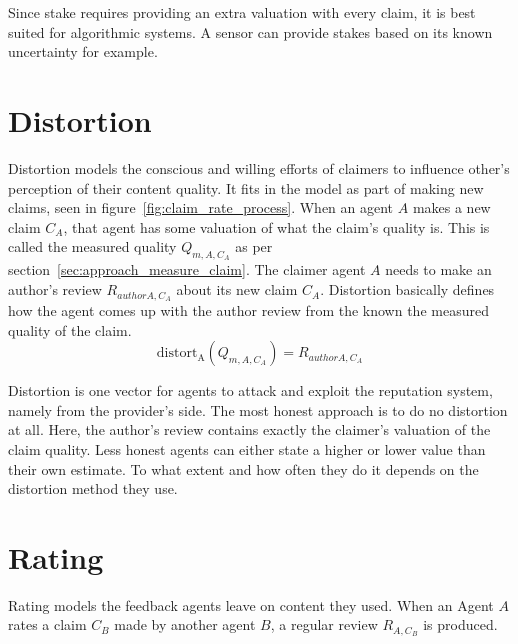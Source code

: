 \documentclass[%
    ]{\PathToTumTemplate/thesis/tum_thesis}
\begin{document}
Since stake requires providing an extra valuation with every claim, it is best suited for algorithmic systems.
A sensor can provide stakes based on its known uncertainty for example.



\section{Distortion}\label{sec:distort_strategies}

Distortion models the conscious and willing efforts of claimers to influence other's perception of their content quality.
It fits in the model as part of making new claims, seen in figure~\ref{fig:claim_rate_process}.
When an agent $A$ makes a new claim $C_A$, that agent has some valuation of what the claim's quality is.
This is called the measured quality $Q_{m,A,C_{A}}$ as per section~\ref{sec:approach_measure_claim}.
The claimer agent $A$ needs to make an author's review $R_{author A, C_{A}}$ about its new claim $C_A$.
Distortion basically defines how the agent comes up with the author review from the known the measured quality of the claim.
\begin{equation}
\mathrm{distort_{A}}(Q_{m,A,C_{A}}) = R_{author A, C_{A}}
\end{equation}

Distortion is one vector for agents to attack and exploit the reputation system, namely from the provider's side.
The most honest approach is to do no distortion at all.
Here, the author's review contains exactly the claimer's valuation of the claim quality.
Less honest agents can either state a higher or lower value than their own estimate.
To what extent and how often they do it depends on the distortion method they use.




\section{Rating}\label{sec:approach_rating_strategies}

Rating models the feedback agents leave on content they used.
When an Agent $A$ rates a claim $C_B$ made by another agent $B$, a regular review $R_{A,C_{B}}$ is produced.
\end{document}
